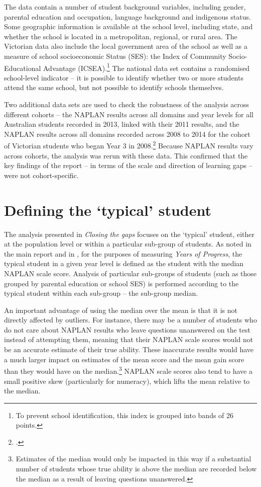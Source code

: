 The data contain a number of student background variables, including gender, parental education and occupation, language background and indigenous status. Some geographic information is available at the school level, including state, and whether the school is located in a metropolitan, regional, or rural area. The Victorian data also include the local government area of the school as well as a measure of school socioeconomic Status (SES): the Index of Community Socio-Educational Advantage (ICSEA).\footnote{To prevent school identification, this index is grouped into bands of 26 points.} The national data set contains a randomised school-level indicator -- it is possible to identify whether two or more students attend the same school, but not possible to identify schools themselves. 

Two additional data sets are used to check the robustness of the analysis across different cohorts -- the NAPLAN results across all domains and year levels for all Australian students recorded in 2013, linked with their 2011 results, and the NAPLAN results across all domains recorded across 2008 to 2014 for the cohort of Victorian students who began Year 3 in 2008.\footcite{acara2013,vcaa2014} Because NAPLAN results vary across cohorts, the analysis was rerun with these data. This confirmed that the key findings of the report -- in terms of the scale and direction of learning gaps -- were not cohort-specific.

\section{Defining the `typical' student}

The analysis presented in \textit{Closing the gaps} focuses on the `typical' student, either at the population level or within a particular sub-group of students. As noted in the main report and in , for the purposes of measuring \textit{Years of Progress}, the typical student in a given year level is defined as the student with the median NAPLAN scale score. Analysis of particular sub-groups of students (such as those grouped by parental education or school SES) is performed according to the typical student within each sub-group -- the sub-group median.

An important advantage of using the median over the mean is that it is not directly affected by outliers. For instance, there may be a number of students who do not care about NAPLAN results who leave questions unanswered on the test instead of attempting them, meaning that their NAPLAN scale scores would not be an accurate estimate of their true ability. These inaccurate results would have a much larger impact on estimates of the mean score and the mean gain score than they would have on the median.\footnote{Estimates of the median would only be impacted in this way if a substantial number of students whose true ability is above the median are recorded below the median as a result of leaving questions unanswered.} NAPLAN scale scores also tend to have a small positive skew (particularly for numeracy), which lifts the mean relative to the median.

